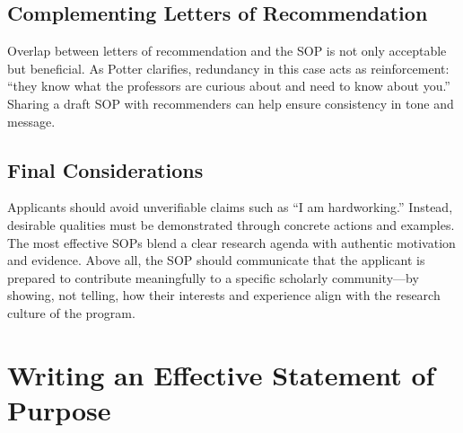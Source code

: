 \subsection{Complementing Letters of Recommendation}

Overlap between letters of recommendation and the SOP is not only acceptable but beneficial.
As Potter clarifies, redundancy in this case acts as reinforcement: ``they know what the professors are curious about and need to know about you.''
Sharing a draft SOP with recommenders can help ensure consistency in tone and message.

\subsection{Final Considerations}

Applicants should avoid unverifiable claims such as ``I am hardworking.''
Instead, desirable qualities must be demonstrated through concrete actions and examples.
The most effective SOPs blend a clear research agenda with authentic motivation and evidence.
Above all, the SOP should communicate that the applicant is prepared to contribute meaningfully to a specific scholarly community---by showing, not telling, how their interests and experience align with the research culture of the program.

\section{Writing an Effective Statement of Purpose}
\label{sec:effective_sop}
